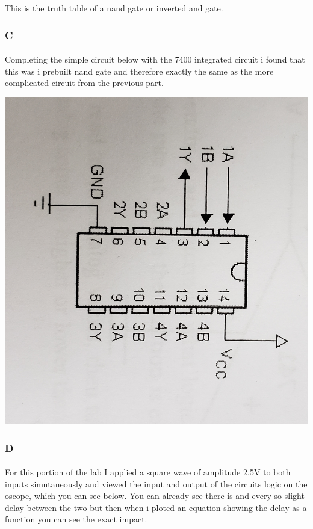 \documentclass[12pt]{article}
\begin{document}
					This is the truth table of a nand gate or inverted and gate.

			\subsubsection{C}
				\paragraph{}
					Completing the simple circuit below with the 7400 integrated circuit i found that this was i prebuilt nand gate and therefore
					exactly the same as the more complicated circuit from the previous part.
					
					\begin{center}
						\includegraphics[scale=0.08]{mystery.jpg}\\
					\end{center}

			\subsubsection{D}
				\paragraph{}
					For this portion of the lab I applied a square wave of amplitude 2.5V to both inputs simutaneously and viewed the input and output of the circuits
					logic on the oscope, which you can see below.  You can already see there is and every so slight delay between the two but then when i ploted an
					equation showing the delay as a function you can see the exact impact.
\end{document}
